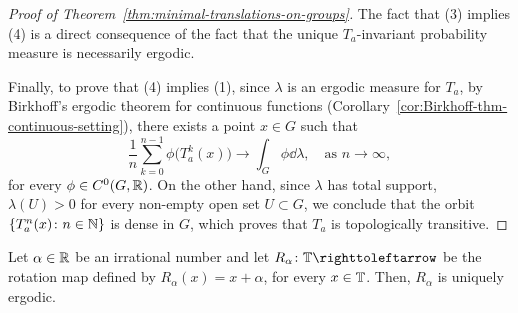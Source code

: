\begin{proof}[Proof of Theorem~\ref{thm:minimal-translations-on-groups}]
  The fact that (3) implies (4) is a direct consequence of the fact that the unique $T_a$-invariant probability measure is necessarily ergodic.

  Finally, to prove that (4) implies (1), since $\lambda$ is an ergodic measure for $T_a$, by Birkhoff's ergodic theorem for continuous functions (Corollary~\ref{cor:Birkhoff-thm-continuous-setting}), there exists a point $x\in G$ such that
  \begin{displaymath}
    \frac{1}{n}\sum_{k=0}^{n-1}\phi\big(T_a^k(x)\big)\to\int_G\phi\dd\lambda,\quad\text{as }n\to\infty,
  \end{displaymath}
  for every $\phi\in C^0(G,\mathbb{R})$. On the other hand, since $\lambda$ has total support, \ie~$\lambda(U)>0$ for every non-empty open set $U\subset G$, we conclude that the orbit $\{T_a^n(x)\colon n\in\mathbb{N}\}$ is dense in $G$, which proves that $T_a$ is topologically transitive.
\end{proof}


\begin{corollary}
  \label{cor:irrational-rotation-uniquely-ergodic}
  Let $\alpha\in\mathbb{R}$ be an irrational number and let $R_\alpha\colon\T\carr$ be the rotation map defined by $R_\alpha(x)=x+\alpha$, for every $x\in\mathbb{T}$. Then, $R_\alpha$ is uniquely ergodic.
\end{corollary}

